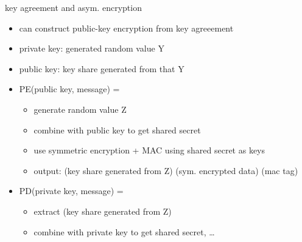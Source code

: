 \begin{frame}{key agreement and asym. encryption}
    \begin{itemize}
    \item can construct public-key encryption from key agreeement
    \vspace{.5cm}
    \item private key: generated random value Y
    \item public key: key share generated from that Y
    \item<2-> PE(public key, message) =
        \begin{itemize}
        \item generate random value Z
        \item combine with public key to get shared secret
        \item use symmetric encryption + MAC using shared secret as keys
        \item output: (key share generated from Z) (sym. encrypted data) (mac tag)
        \end{itemize}
    \item<3-> PD(private key, message) =
        \begin{itemize}
        \item extract (key share generated from Z)
        \item combine with private key to get shared secret, \ldots
        \end{itemize}
    \end{itemize}
\end{frame}
